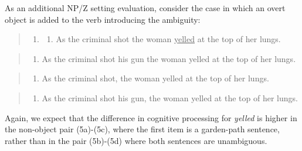 \documentclass[a4paper, nobind]{templates/ociamthesis}
\providecommand{\tightlist}{%
  \setlength{\itemsep}{0pt}\setlength{\parskip}{0pt}}
\begin{document}
As an additional NP/Z setting evaluation, consider the case in which an overt object is added to the verb introducing the ambiguity:

\begin{quote}
\begin{enumerate}
\def\labelenumi{(\arabic{enumi})}
\setcounter{enumi}{4}
\item
  \begin{enumerate}
  \def\labelenumii{\alph{enumii}.}
  \tightlist
  \item
    As the criminal shot the woman \underline{yelled} at the top of her lungs. \footnotesize{}
  \end{enumerate}
\end{enumerate}
\end{quote}

\begin{quote}
\begin{enumerate}
\def\labelenumi{\alph{enumi}.}
\setcounter{enumi}{1}
\tightlist
\item
  As the criminal shot his gun the woman yelled at the top of her lungs. \footnotesize{}
\end{enumerate}
\end{quote}

\begin{quote}
\begin{enumerate}
\def\labelenumi{\alph{enumi}.}
\setcounter{enumi}{2}
\tightlist
\item
  As the criminal shot, the woman yelled at the top of her lungs. \footnotesize{}
\end{enumerate}
\end{quote}

\begin{quote}
\begin{enumerate}
\def\labelenumi{\alph{enumi}.}
\setcounter{enumi}{3}
\tightlist
\item
  As the criminal shot his gun, the woman yelled at the top of her lungs. \footnotesize{}
\end{enumerate}
\end{quote}

Again, we expect that the difference in cognitive processing for \emph{yelled} is higher in the non-object pair (5a)-(5c), where the first item is a garden-path sentence, rather than in the pair (5b)-(5d) where both sentences are unambiguous.
\end{document}
